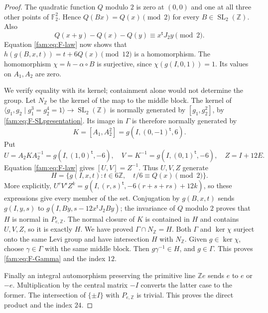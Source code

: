 \begin{proof}
The quadratic function $Q$ modulo $2$ is zero at $(0,0)$ and one at all
three other points of $\mathbb F_2^2$.  Hence $Q(Bx)=Q(x)\pmod2$ for every
$B\in\operatorname{SL}_2(\mathbb Z)$.  Also
\[
 Q(x+y)-Q(x)-Q(y)\equiv x^{\mathsf t}J_2y\pmod2.
\]
Equation \eqref{fam:eq:F-law} now shows that
$h(g(B,x,t))=t+6Q(x)\pmod{12}$ is a homomorphism.
The homomorphism $\chi=h-\alpha\circ B$ is surjective, since
$\chi(g(I,0,1))=1$.  Its values on $A_1,A_2$ are zero.

We verify equality with its kernel; containment alone would not determine
the group.  Let $N_{\mathbb Z}$ be the kernel of the map to the middle
block.  The kernel of
$\langle g_1,g_2\mid g_1^3=g_2^4=1\rangle\to
\operatorname{SL}_2(\mathbb Z)$ is normally generated by
$[g_1,g_2^2]$, by \eqref{fam:eq:F-SLpresentation}.  Its image in $\Gamma$ is
therefore normally generated by
\[
 K=[A_1,A_2^2]=g(I,(0,-1)^{\mathsf t},6).
\]
Put
\[
 U=A_2KA_2^{-1}=g(I,(1,0)^{\mathsf t},-6),\quad
 V=K^{-1}=g(I,(0,1)^{\mathsf t},-6),\quad Z=I+12E.
\]
Equation \eqref{fam:eq:F-law} gives $[U,V]=Z^{-1}$.  Thus $U,V,Z$ generate
\begin{equation}\label{fam:eq:F-H}
 H=\{g(I,x,t):t\in6\mathbb Z,\quad t/6\equiv Q(x)\pmod2\}.
\end{equation}
More explicitly,
$U^rV^sZ^k=g(I,(r,s)^{\mathsf t},-6(r+s+rs)+12k)$, so these expressions
give every member of the set.  Conjugation by $g(B,x,t)$ sends
$g(I,y,s)$ to $g(I,By,s-12x^{\mathsf t}J_2By)$; the invariance of $Q$
modulo $2$ proves that $H$ is normal in $P_{e,\mathbb Z}$.  The normal
closure of $K$ is contained in $H$ and contains $U,V,Z$, so it is exactly
$H$.  We have proved $\Gamma\cap N_{\mathbb Z}=H$.  Both $\Gamma$ and
$\ker\chi$ surject onto the same Levi group and have intersection $H$
with $N_{\mathbb Z}$.  Given $g\in\ker\chi$, choose $\gamma\in\Gamma$
with the same middle block.  Then $g\gamma^{-1}\in H$, and $g\in\Gamma$.
This proves \eqref{fam:eq:F-Gamma} and the index $12$.

Finally an integral automorphism preserving the primitive line
$\mathbb Ze$ sends $e$ to $e$ or $-e$.  Multiplication by the central
matrix $-I$ converts the latter case to the former.  The intersection of
$\{\pm I\}$ with $P_{e,\mathbb Z}$ is trivial.  This proves the direct
product and the index $24$.
\end{proof}

